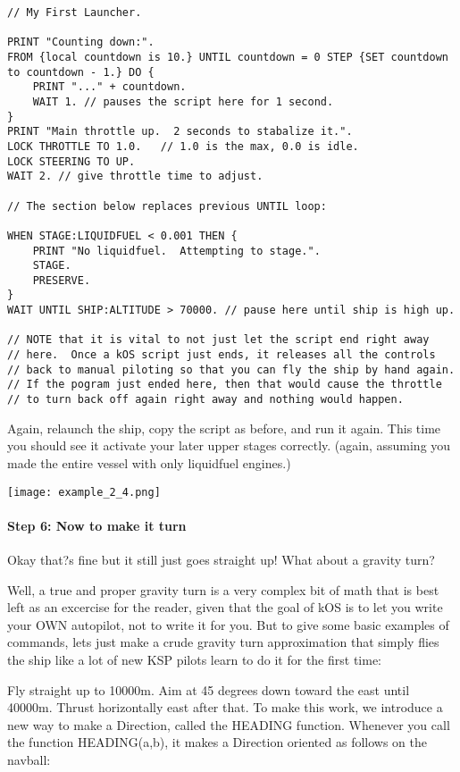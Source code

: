 \begin{Verbatim}[frame=single]
// My First Launcher.

PRINT "Counting down:".
FROM {local countdown is 10.} UNTIL countdown = 0 STEP {SET countdown to countdown - 1.} DO {
    PRINT "..." + countdown.
    WAIT 1. // pauses the script here for 1 second.
}
PRINT "Main throttle up.  2 seconds to stabalize it.".
LOCK THROTTLE TO 1.0.   // 1.0 is the max, 0.0 is idle.
LOCK STEERING TO UP.
WAIT 2. // give throttle time to adjust.

// The section below replaces previous UNTIL loop:

WHEN STAGE:LIQUIDFUEL < 0.001 THEN {
    PRINT "No liquidfuel.  Attempting to stage.".
    STAGE.
    PRESERVE.
}
WAIT UNTIL SHIP:ALTITUDE > 70000. // pause here until ship is high up.

// NOTE that it is vital to not just let the script end right away
// here.  Once a kOS script just ends, it releases all the controls
// back to manual piloting so that you can fly the ship by hand again.
// If the pogram just ended here, then that would cause the throttle
// to turn back off again right away and nothing would happen.
\end{Verbatim} 
Again, relaunch the ship, copy the script as before, and run it again. This time you should see it activate your later upper stages correctly. (again, assuming you made the entire vessel with only liquidfuel engines.)

\begin{center}
\texttt{[image: example\_2\_4.png]}
\end{center}

\paragraph{Step 6: Now to make it turn}
Okay that?s fine but it still just goes straight up! What about a gravity turn?

Well, a true and proper gravity turn is a very complex bit of math that is best left as an excercise for the reader, given that the goal of kOS is to let you write your OWN autopilot, not to write it for you. But to give some basic examples of commands, lets just make a crude gravity turn approximation that simply flies the ship like a lot of new KSP pilots learn to do it for the first time:

Fly straight up to 10000m.
Aim at 45 degrees down toward the east until 40000m.
Thrust horizontally east after that.
To make this work, we introduce a new way to make a Direction, called the HEADING function. Whenever you call the function HEADING(a,b), it makes a Direction oriented as follows on the navball:

